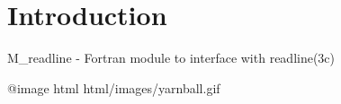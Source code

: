 \hypertarget{index_Introduction}{}\section{Introduction}\label{index_Introduction}
M\+\_\+readline -\/ Fortran module to interface with readline(3c) \begin{DoxyVerb}@image html html/images/yarnball.gif\end{DoxyVerb}
 